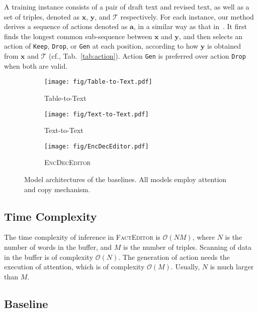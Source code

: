 \documentclass[11pt,a4paper]{article}
\begin{document}
A training instance consists of a pair of draft text and revised text, as well as a set of triples, denoted as $\boldsymbol{x}$, $\boldsymbol{y}$, and $\mathcal{T}$  respectively. For each instance, our method derives a sequence of actions denoted as $\boldsymbol{a}$, in a similar way as that in~\cite{dong2019editnts}. It first finds the longest common sub-sequence between $\boldsymbol{x}$ and $\boldsymbol{y}$, and then selects an action of \texttt{Keep}, \texttt{Drop}, or \texttt{Gen} at each position, according to how $\boldsymbol{y}$ is obtained from $\boldsymbol{x}$ and $\mathcal{T}$ (cf., Tab.~\ref{tab:action}). Action \texttt{Gen} is preferred over action \texttt{Drop} when both are valid.
\begin{figure*}
    \centering
    \begin{subfigure}[b]{0.3\linewidth}
        \centering
        \texttt{[image: fig/Table-to-Text.pdf]}
        \caption{Table-to-Text}
        \label{fig:d2t}
    \end{subfigure}
    \hfill
    \begin{subfigure}[b]{0.3\linewidth}
        \centering
        \texttt{[image: fig/Text-to-Text.pdf]}
        \caption{Text-to-Text}
        \label{fig:t2t}
    \end{subfigure}
    \hfill
    \begin{subfigure}[b]{0.35\linewidth}
        \centering
        \texttt{[image: fig/EncDecEditor.pdf]}
        \caption{\textsc{EncDecEditor}}
        \label{fig:encdec}
    \end{subfigure}
    \caption{Model architectures of the baselines. All models employ attention and copy mechanism.}
    \label{fig:baselines}
\end{figure*}

\subsection{Time Complexity}
\label{sec:runtime}

The time complexity of inference in \textsc{FactEditor} is $\mathcal{O}(NM)$, where $N$ is the number of words in the buffer, and $M$ is the number of triples. Scanning of data in the buffer is of complexity $\mathcal{O}(N)$. The generation of action needs the execution of attention, which is of complexity $\mathcal{O}(M)$. Usually, $N$ is much larger than $M$. 

\subsection{Baseline}
\end{document}
